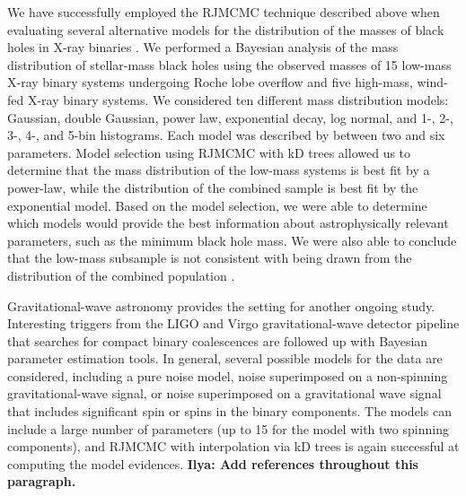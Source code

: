 \documentclass[prd,preprint]{revtex4}
\newcommand{\ilya}[1]{{\color{red} \bf Ilya: #1}}
\begin{document}
We have successfully employed the RJMCMC technique described above
when evaluating several alternative models for the distribution of the
masses of black holes in X-ray binaries \cite{Farr2010}.  We
performed a Bayesian analysis of the mass distribution of stellar-mass
black holes using the observed masses of 15 low-mass X-ray binary
systems undergoing Roche lobe overflow and five high-mass, wind-fed
X-ray binary systems.  We considered ten different mass distribution
models: Gaussian, double Gaussian, power law, exponential decay, log
normal, and 1-, 2-, 3-, 4-, and 5-bin histograms.  Each model was
described by between two and six parameters.  Model selection using
RJMCMC with kD trees allowed us to determine that the mass
distribution of the low-mass systems is best fit by a power-law, while
the distribution of the combined sample is best fit by the exponential
model.  Based on the model selection, we were able to determine which
models would provide the best information about astrophysically
relevant parameters, such as the minimum black hole mass.  We were
also able to conclude that the low-mass subsample is not consistent
with being drawn from the distribution of the combined population
\cite{Farr2010}.

Gravitational-wave astronomy provides the setting for another ongoing
study.  Interesting triggers from the LIGO and Virgo
gravitational-wave detector pipeline that searches for compact binary
coalescences are followed up with Bayesian parameter estimation tools.
In general, several possible models for the data are considered,
including a pure noise model, noise superimposed on a non-spinning
gravitational-wave signal, or noise superimposed on a gravitational
wave signal that includes significant spin or spins in the binary
components.  The models can include a large number of parameters (up
to 15 for the model with two spinning components), and RJMCMC with
interpolation via kD trees is again successful at computing the model
evidences. \ilya{Add references throughout this paragraph.}
\end{document}
